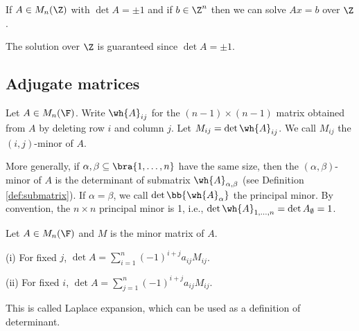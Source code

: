 \begin{corollary}
If $A \in M_n(\Z)$ with $\det A = \pm 1$ and if $b \in \Z^n$ then we can solve $Ax = b$ over $\Z$.
\end{corollary}

\begin{remark}
The solution over $\Z$ is guaranteed since $\det A = \pm 1$.
\end{remark}





\subsection{Adjugate matrices}

\begin{definition}\label{def:minor_matrix}
Let $A \in M_n(\F)$. Write $\wh{A}_{ij}$ for the $(n - 1) \times (n - 1)$ matrix obtained from $A$ by deleting row $i$ and column $j$. Let $M_{ij} = \det \wh{A}_{ij}$. We call $M_{ij}$ the
$(i,j)$-minor of $A$.

More generally, if $\alpha, \beta \subseteq \bra{1,\dots,n}$ have the same size, then the $(\alpha,\beta)$-minor of $A$ is the determinant of submatrix $\wh{A}_{\alpha,\beta}$ (see Definition
\ref{def:submatrix}). If $\alpha = \beta$, we call $\det\bb{\wh{A}_\alpha}$ the principal minor. By convention, the $n\times n$ principal minor is 1, i.e., $\det
\wh{A}_{1,\dots,n} = \det A_\emptyset = 1$.
\end{definition}




\begin{lemma}\label{lem:determinant_minor_matrix}
Let $A\in M_n(\F)$ and $M$ is the minor matrix of $A$.
\ben
\item [(i)] For fixed $j$, $\det A = \sum^n_{i=1} (-1)^{i+j} a_{ij} M_{ij}$.
\item [(ii)] For fixed $i$, $\det A = \sum^n_{j=1} (-1)^{i+j} a_{ij} M_{ij} $.
\een

This is called Laplace expansion, which can be used as a definition of determinant.
\end{lemma}



